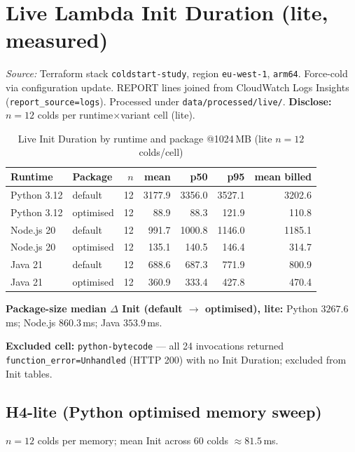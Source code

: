 \section{Live Lambda Init Duration (lite, measured)}
\label{sec:eval_live_init}

\textit{Source:} Terraform stack \texttt{coldstart-study}, region \texttt{eu-west-1},
\texttt{arm64}. Force-cold via configuration update. REPORT lines joined from CloudWatch
Logs Insights (\texttt{report\_source=logs}). Processed under
\texttt{data/processed/live/}. \textbf{Disclose:} $n{=}12$ colds per runtime$\times$variant
cell (lite).

\begin{table}[h]
\centering
\caption{Live Init Duration by runtime and package @1024\,MB (lite $n{=}12$ colds/cell)}
\label{tab:eval_live_init}
\begin{tabular}{llrrrrr}
\hline
\textbf{Runtime} & \textbf{Package} & \textbf{$n$} & \textbf{mean} & \textbf{p50} & \textbf{p95} & \textbf{mean billed} \\
\hline
Python 3.12 & default & 12 & 3177.9 & 3356.0 & 3527.1 & 3202.6 \\
Python 3.12 & optimised & 12 & 88.9 & 88.3 & 121.9 & 110.8 \\
Node.js 20 & default & 12 & 991.7 & 1000.8 & 1146.0 & 1185.1 \\
Node.js 20 & optimised & 12 & 135.1 & 140.5 & 146.4 & 314.7 \\
Java 21 & default & 12 & 688.6 & 687.3 & 771.9 & 800.9 \\
Java 21 & optimised & 12 & 360.9 & 333.4 & 427.8 & 470.4 \\
\hline
\end{tabular}
\end{table}

\textbf{Package-size median $\Delta$ Init (default $\rightarrow$ optimised), lite:}
Python $3267.6$\,ms; Node.js $860.3$\,ms; Java $353.9$\,ms.

\textbf{Excluded cell:} \texttt{python-bytecode} --- all 24 invocations returned
\texttt{function\_error=Unhandled} (HTTP 200) with no Init Duration; excluded from Init
tables.

\subsection{H4-lite (Python optimised memory sweep)}

$n{=}12$ colds per memory; mean Init across 60 colds $\approx 81.5$\,ms.

